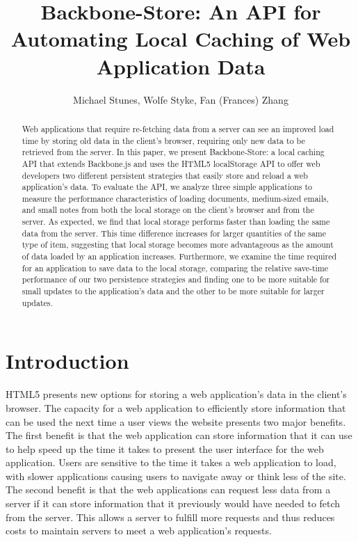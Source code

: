 \documentclass[12pt]{article}
\title{Backbone-Store: An API for Automating Local Caching of Web Application
Data}
\author{Michael Stunes, Wolfe Styke, Fan (Frances) Zhang}
\begin{document}
\maketitle

\begin{abstract}
Web applications that require re-fetching data from a server
can see an improved load time by storing old data in the client's browser,
requiring only new data to be retrieved from the server. In this paper, we present Backbone-Store: a local caching API that extends Backbone.js and uses the HTML5 localStorage API to offer web developers two different persistent strategies that easily store and reload a web application's data. To evaluate the API,  we analyze three simple applications to measure the performance characteristics of loading documents, medium-sized emails, and small notes from both the local storage on the client's browser and from the server. As expected, we find that local storage performs
faster than loading the same data from the server. This time difference
increases for larger quantities of the same type of item, suggesting that local storage becomes more advantageous as the amount of data loaded by an application increases. Furthermore, we examine the time required for an application to save data to the local storage, comparing the relative save-time performance of our two persistence strategies and finding one to be more suitable for small updates to the application's data and the other to be more suitable for larger updates.
\end{abstract}

\section{Introduction}

HTML5 presents new options for storing a web application's data in the client's
browser. The capacity for a web application to efficiently store information
that can be used the next time a user views the website presents two major
benefits. The first benefit is that the web application can store information
that it can use to help speed up the time it takes to present the user
interface for the web application. Users are sensitive to the time it takes a
web application to load, with slower applications causing users to navigate
away or think less of the site. The second benefit is that the web applications
can request less data from a server if it can store information that it
previously would have needed to fetch from the server. This allows a server to
fulfill more requests and thus reduces costs to maintain servers to meet a web
application's requests.
\end{document}
